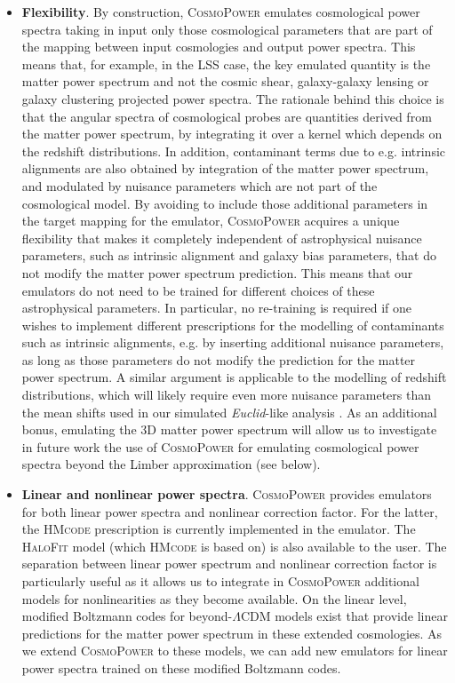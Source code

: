\documentclass[fleqn,usenatbib]{mnras}
\begin{document}
\begin{itemize}
\smallskip

\item \textbf{Flexibility}. By construction, \textsc{CosmoPower} emulates cosmological power spectra taking in input only those cosmological parameters that are part of the mapping between input cosmologies and output power spectra. This means that, for example, in the LSS case, the key emulated quantity is the matter power spectrum and not the cosmic shear, galaxy-galaxy lensing or galaxy clustering projected power spectra. The rationale behind this choice is that the angular spectra of cosmological probes are quantities derived from the matter power spectrum, by integrating it over a kernel which depends on the redshift distributions. In addition, contaminant terms due to e.g. intrinsic alignments are also obtained by integration of the matter power spectrum, and modulated by nuisance parameters which are not part of the cosmological model. By avoiding to include those additional parameters in the target mapping for the emulator, \textsc{CosmoPower} acquires a unique flexibility that makes it completely independent of astrophysical nuisance parameters, such as intrinsic alignment and galaxy bias parameters, that do not modify the matter power spectrum prediction. This means that our emulators do not need to be trained for different choices of these astrophysical parameters. In particular, no re-training is required if one wishes to implement different prescriptions for the modelling of contaminants such as intrinsic alignments, e.g. by inserting additional nuisance parameters, as long as those parameters do not modify the prediction for the matter power spectrum. A similar argument is applicable to the modelling of redshift distributions, which will likely require even more nuisance parameters than the mean shifts used in our simulated \textit{Euclid}-like analysis \citep[see e.g.][]{Hasan21}. As an additional bonus, emulating the 3D matter power spectrum will allow us to investigate in future work the use of \textsc{CosmoPower} for emulating cosmological power spectra beyond the Limber approximation (see below).

\smallskip

\item \textbf{Linear and nonlinear power spectra}. \textsc{CosmoPower} provides emulators for both linear power spectra and nonlinear correction factor. For the latter, the \textsc{HMcode} prescription is currently implemented in the emulator. The \textsc{HaloFit} model (which \textsc{HMcode} is based on) is also available to the user. The separation between linear power spectrum and nonlinear correction factor is particularly useful as it allows us to integrate in \textsc{CosmoPower} additional models for nonlinearities as they become available. On the linear level, modified Boltzmann codes for beyond-$\Lambda$CDM models exist \citep[for example \textsc{HiClass} for Horndeski models;][]{Zumalacarregui17} that provide linear predictions for the matter power spectrum in these extended cosmologies. As we extend \textsc{CosmoPower} to these models, we can add new emulators for linear power spectra trained on these modified Boltzmann codes.   


\end{itemize}
\end{document}
